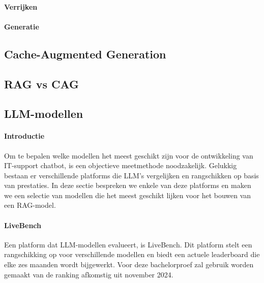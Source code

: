     \paragraph{Verrijken}
    \paragraph{Generatie}

    
    \subsection{Cache-Augmented Generation}
    
    
    \subsection{RAG vs CAG}
    
    
    \subsection{LLM-modellen}
    
    \paragraph{Introductie}
    Om te bepalen welke modellen het meest geschikt zijn voor de ontwikkeling van IT-support chatbot, is een objectieve meetmethode noodzakelijk. Gelukkig bestaan er verschillende platforms die LLM's vergelijken en rangschikken op basis van prestaties. In deze sectie bespreken we enkele van deze platforms en maken we een selectie van modellen die het meest geschikt lijken voor het bouwen van een RAG-model.
    
    
    \paragraph{LiveBench} 
    Een platform dat LLM-modellen evalueert, is LiveBench. Dit platform stelt een rangschikking op voor verschillende modellen en biedt een actuele leaderboard die elke zes maanden wordt bijgewerkt. Voor deze bachelorproef zal gebruik worden gemaakt van de ranking afkomstig uit november 2024.
    
